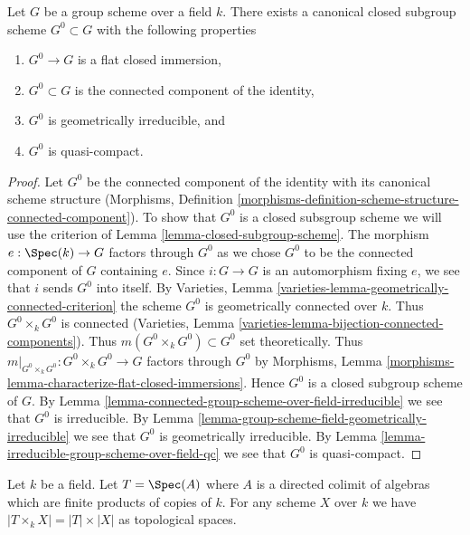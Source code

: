 \begin{proposition}
\label{proposition-connected-component}
Let $G$ be a group scheme over a field $k$. There exists a canonical closed
subgroup scheme $G^0 \subset G$ with the following properties
\begin{enumerate}
\item $G^0 \to G$ is a flat closed immersion,
\item $G^0 \subset G$ is the connected component of the identity,
\item $G^0$ is geometrically irreducible, and
\item $G^0$ is quasi-compact.
\end{enumerate}
\end{proposition}

\begin{proof}
Let $G^0$ be the connected component of the identity with its canonical
scheme structure (Morphisms, Definition
\ref{morphisms-definition-scheme-structure-connected-component}).
To show that $G^0$ is a closed subsgroup scheme we will use the
criterion of Lemma \ref{lemma-closed-subgroup-scheme}.
The morphism $e : \Spec(k) \to G$ factors through $G^0$ as we chose
$G^0$ to be the connected component of $G$ containing $e$.
Since $i : G \to G$ is an automorphism fixing $e$, we see that
$i$ sends $G^0$ into itself.
By Varieties, Lemma \ref{varieties-lemma-geometrically-connected-criterion}
the scheme $G^0$ is geometrically connected over $k$.
Thus $G^0 \times_k G^0$ is connected
(Varieties, Lemma \ref{varieties-lemma-bijection-connected-components}).
Thus $m(G^0 \times_k G^0) \subset G^0$ set theoretically.
Thus $m|_{G^0 \times_k G^0} : G^0 \times_k G^0 \to G$
factors through $G^0$ by
Morphisms, Lemma \ref{morphisms-lemma-characterize-flat-closed-immersions}.
Hence $G^0$ is a closed subgroup scheme of $G$.
By Lemma \ref{lemma-connected-group-scheme-over-field-irreducible}
we see that $G^0$ is irreducible. By
Lemma \ref{lemma-group-scheme-field-geometrically-irreducible}
we see that $G^0$ is geometrically irreducible. By
Lemma \ref{lemma-irreducible-group-scheme-over-field-qc}
we see that $G^0$ is quasi-compact.
\end{proof}

\begin{lemma}
\label{lemma-profinite-product-over-field}
Let $k$ be a field. Let $T = \Spec(A)$ where $A$ is a directed colimit of
algebras which are finite products of copies of $k$. For any scheme $X$
over $k$ we have $|T \times_k X| = |T| \times |X|$ as topological spaces.
\end{lemma}

